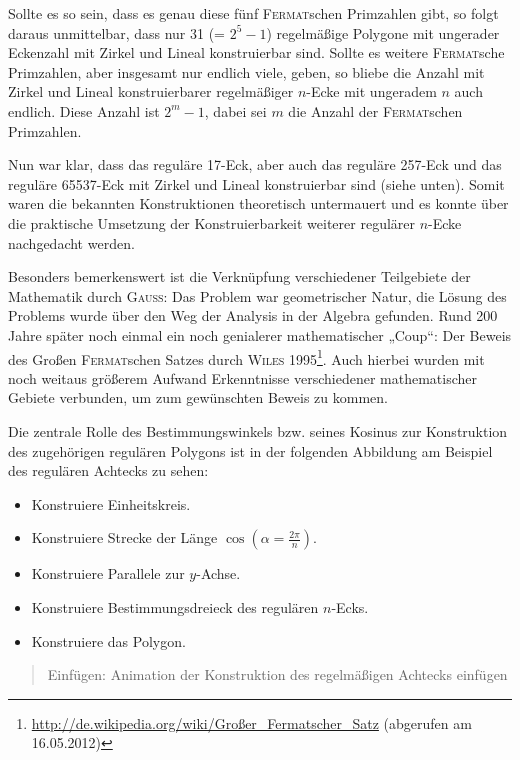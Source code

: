\documentclass[11pt]{article}
\newcommand{\br}[1]{\ensuremath{\left(#1\right)}}
\newcommand{\HGG}[1]{\begin{quote} Einfügen: #1 \end{quote}}
\begin{document}
Sollte es so sein, dass es genau diese fünf \textsc{Fermat}schen Primzahlen
gibt, so folgt daraus unmittelbar, dass nur 31 (= $2^5 - 1$) regelmäßige
Polygone mit ungerader Eckenzahl mit Zirkel und Lineal konstruierbar
sind. Sollte es weitere \textsc{Fermat}sche Primzahlen, aber insgesamt nur
endlich viele, geben, so bliebe die Anzahl mit Zirkel und Lineal
konstruierbarer regelmäßiger $n$-Ecke mit ungeradem $n$ auch endlich. Diese
Anzahl ist $2^m - 1$, dabei sei $m$ die Anzahl der \textsc{Fermat}schen
Primzahlen.

Nun war klar, dass das reguläre 17-Eck, aber auch das reguläre 257-Eck und das
reguläre 65537-Eck mit Zirkel und Lineal konstruierbar sind (siehe unten).
Somit waren die bekannten Konstruktionen theoretisch untermauert und es konnte
über die praktische Umsetzung der Konstruierbarkeit weiterer regulärer
$n$-Ecke nachgedacht werden.

Besonders bemerkenswert ist die Verknüpfung verschiedener Teilgebiete der
Mathematik durch \textsc{Gauss}: Das Problem war geometrischer Natur, die
Lösung des Problems wurde über den Weg der Analysis in der Algebra
gefunden. Rund 200 Jahre später noch einmal ein noch genialerer mathematischer
„Coup“: Der Beweis des Großen \textsc{Fermat}schen Satzes durch \textsc{Wiles}
1995\footnote{\url{http://de.wikipedia.org/wiki/Großer_Fermatscher_Satz}
  (abgerufen am 16.05.2012)}. Auch hierbei wurden mit noch weitaus größerem
Aufwand Erkenntnisse verschiedener mathematischer Gebiete verbunden, um zum
gewünschten Beweis zu kommen.

Die zentrale Rolle des Bestimmungswinkels bzw. seines Kosinus zur Konstruktion
des zugehörigen regulären Polygons ist in der folgenden Abbildung am Beispiel
des regulären Achtecks zu sehen: 
\begin{itemize}
\item Konstruiere Einheitskreis.
\item Konstruiere Strecke der Länge $\cos\br{\alpha=\frac{2\pi}{n}}$.
\item Konstruiere Parallele zur $y$-Achse.
\item Konstruiere Bestimmungsdreieck des regulären $n$-Ecks.
\item Konstruiere das Polygon.
\end{itemize}

\HGG{Animation der Konstruktion des regelmäßigen Achtecks einfügen}
\end{document}
